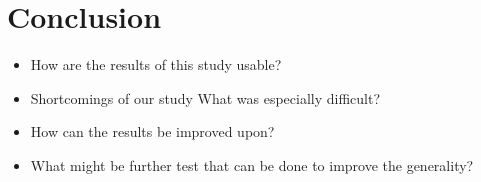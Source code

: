 \documentclass[12pt]{article}
\theoremstyle{plain}
\theoremstyle{definition}
\theoremstyle{remark}
\begin{document}
\section{Conclusion}
\label{sec:conclusion}

\begin{itemize}
	\item How are the results of this study usable? 
	\item Shortcomings of our study What was especially difficult? 	 
	\item How can the results be improved upon? 
	\item What might be further test that can be done to improve the generality? 
\end{itemize}

%
%
\printbibliography[heading=bibintoc]
\end{document}
